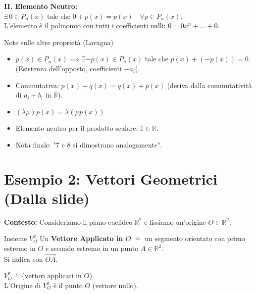 \textbf{II. Elemento Neutro:}\\
$\exists \, 0 \in P_n(x)$ tale che $0 + p(x) = p(x) \quad \forall p \in P_n(x)$.\\
L'elemento è il polinomio con tutti i coefficienti nulli: $0 = 0x^n + \dots + 0$.

\begin{note}{Note sulle altre proprietà (Lavagna)}{}
\begin{itemize}
    \item $p(x) \in P_n(x) \implies \exists -p(x) \in P_n(x)$ tale che $p(x) + (-p(x)) = 0$. (Esistenza dell'opposto, coefficienti $-a_i$).
    \item Commutativa: $p(x) + q(x) = q(x) + p(x)$ (deriva dalla commutatività di $a_i + b_i$ in $\mathbb{R}$).
    \item $(\lambda \mu)p(x) = \lambda (\mu p(x))$
    \item Elemento neutro per il prodotto scalare: $1 \in \mathbb{R}$.
    \item Nota finale: "7 e 8 si dimostrano analogamente".
\end{itemize}
\end{note}

\section{Esempio 2: Vettori Geometrici (Dalla slide)}

\textbf{Contesto:} Consideriamo il piano euclideo $\mathbb{R}^2$ e fissiamo un'origine $O \in \mathbb{R}^2$.

\begin{definition}{Insieme $V_O^2$}{}
Un \textbf{Vettore Applicato in $O$} $\doteq$ un segmento orientato con primo estremo in $O$ e secondo estremo in un punto $A \in \mathbb{R}^2$.\\
Si indica con $\overrightarrow{OA}$.

$V_O^2 \doteq \{ \text{vettori applicati in } O \}$\\
L'Origine di $V_O^2$ è il punto $O$ (vettore nullo).
\end{definition}

